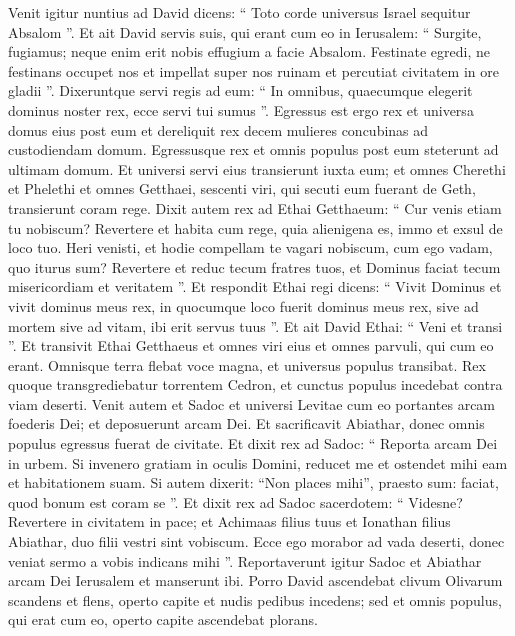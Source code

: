 \begin{biblechapter}
\begin{biblechapter}
\begin{biblechapter}
\begin{biblechapter}
\begin{biblechapter}
\begin{biblechapter}
\begin{biblechapter}
\begin{biblechapter}
\begin{biblechapter}
\begin{biblechapter}
\begin{biblechapter}
\begin{biblechapter}
\begin{biblechapter}
\begin{biblechapter}
\begin{biblechapter}
 \verse Venit igitur nuntius ad David dicens: “ Toto corde universus Israel sequitur Absalom ”. 
\verse Et ait David servis suis, qui erant cum eo in Ierusalem: “ Surgite, fugiamus; neque enim erit nobis effugium a facie Absalom. Festinate egredi, ne festinans occupet nos et impellat super nos ruinam et percutiat civitatem in ore gladii ”. 
\verse Dixeruntque servi regis ad eum: “ In omnibus, quaecumque elegerit dominus noster rex, ecce servi tui sumus ”. 
\verse Egressus est ergo rex et universa domus eius post eum et dereliquit rex decem mulieres concubinas ad custodiendam domum. 
\verse Egressusque rex et omnis populus post eum steterunt ad ultimam domum. 
\verse Et universi servi eius transierunt iuxta eum; et omnes Cherethi et Phelethi et omnes Getthaei, sescenti viri, qui secuti eum fuerant de Geth, transierunt coram rege.
 \verse Dixit autem rex ad Ethai Getthaeum: “ Cur venis etiam tu nobiscum? Revertere et habita cum rege, quia alienigena es, immo et exsul de loco tuo. 
\verse Heri venisti, et hodie compellam te vagari nobiscum, cum ego vadam, quo iturus sum? Revertere et reduc tecum fratres tuos, et Dominus faciat tecum misericordiam et veritatem ”. 
\verse Et respondit Ethai regi dicens: “ Vivit Dominus et vivit dominus meus rex, in quocumque loco fuerit dominus meus rex, sive ad mortem sive ad vitam, ibi erit servus tuus ”. 
\verse Et ait David Ethai: “ Veni et transi ”. Et transivit Ethai Getthaeus et omnes viri eius et omnes parvuli, qui cum eo erant. 
\verse Omnisque terra flebat voce magna, et universus populus transibat. Rex quoque transgrediebatur torrentem Cedron, et cunctus populus incedebat contra viam deserti.
 \verse Venit autem et Sadoc et universi Levitae cum eo portantes arcam foederis Dei; et deposuerunt arcam Dei. Et sacrificavit Abiathar, donec omnis populus egressus fuerat de civitate. 
\verse Et dixit rex ad Sadoc: “ Reporta arcam Dei in urbem. Si invenero gratiam in oculis Domini, reducet me et ostendet mihi eam et habitationem suam. 
\verse Si autem dixerit: “Non places mihi”, praesto sum: faciat, quod bonum est coram se ”. 
\verse Et dixit rex ad Sadoc sacerdotem: “ Videsne? Revertere in civitatem in pace; et Achimaas filius tuus et Ionathan filius Abiathar, duo filii vestri sint vobiscum. 
\verse Ecce ego morabor ad vada deserti, donec veniat sermo a vobis indicans mihi ”. 
\verse Reportaverunt igitur Sadoc et Abiathar arcam Dei Ierusalem et manserunt ibi.
 \verse Porro David ascendebat clivum Olivarum scandens et flens, operto capite et nudis pedibus incedens; sed et omnis populus, qui erat cum eo, operto capite ascendebat plorans. 

\end{biblechapter}
\end{biblechapter}
\end{biblechapter}
\end{biblechapter}
\end{biblechapter}
\end{biblechapter}
\end{biblechapter}
\end{biblechapter}
\end{biblechapter}
\end{biblechapter}
\end{biblechapter}
\end{biblechapter}
\end{biblechapter}
\end{biblechapter}
\end{biblechapter}
